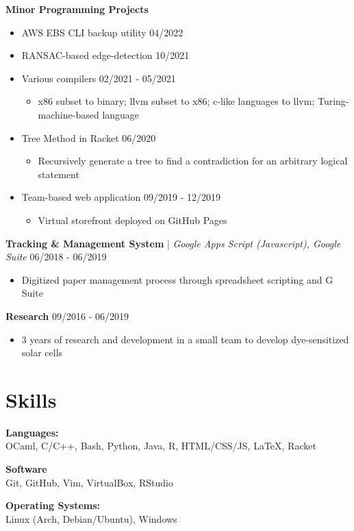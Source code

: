 \documentclass[10pt,letterpaper]{article}
\begin{document}
    \textbf{Minor Programming Projects}\hfill
    \begin{itemize}
      \item AWS EBS CLI backup utility \hfill 04/2022
      \item RANSAC-based edge-detection \hfill 10/2021
      \item Various compilers \hfill 02/2021 - 05/2021
        \begin{itemize}
          \item x86 subset to binary; llvm subset to x86; c-like languages to llvm; Turing-machine-based language
        \end{itemize}
      \item Tree Method in Racket \hfill 06/2020
        \begin{itemize}
          \item Recursively generate a tree to find a contradiction for an arbitrary logical statement
        \end{itemize}
      \item Team-based web application \hfill 09/2019 - 12/2019
        \begin{itemize}
          \item Virtual storefront deployed on GitHub Pages
        \end{itemize}
    \end{itemize}

    \textbf{Tracking \& Management System} | \textit{Google Apps Script (Javascript), Google Suite}\hfill
      06/2018 - 06/2019
      \begin{itemize}
        \item Digitized paper management process through spreadsheet scripting and G Suite
      \end{itemize}

    \textbf{Research}\hfill
    09/2016 - 06/2019
    \begin{itemize}
      \item 3 years of research and development in a small team to develop dye-sensitized solar cells
    \end{itemize}
    
  \section{Skills}
    \textbf{Languages:}\\
    OCaml, C/C++, Bash, Python, Java, R, HTML/CSS/JS, LaTeX, Racket
    
    \begin{minipage}[t]{3in}
      \textbf{Software}\\
      Git, GitHub, Vim, VirtualBox, RStudio
    \end{minipage}\hfill
    \begin{minipage}[t]{2.5in}
      \textbf{Operating Systems:}\\
      Linux (Arch, Debian/Ubuntu), Windows
    \end{minipage}
    
\end{document}
